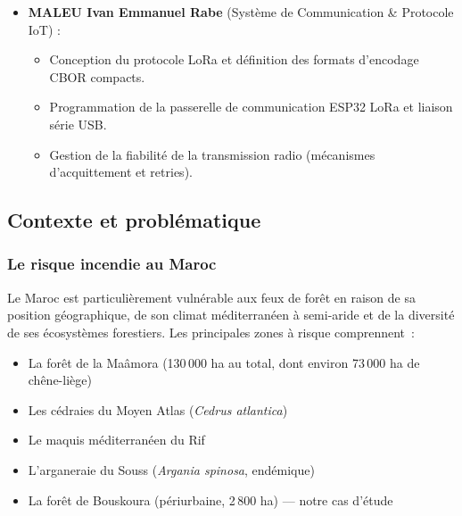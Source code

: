 \documentclass[a4paper,12pt,openany,titlepage]{scrartcl}
\begin{document}
\begin{itemize}
\begin{itemize}[nosep]
            \item Export et intégration du pipeline de vision sous format ONNX Runtime pour exécution sur le RPi4.
            \item Collecte des données de télédétection et liaison avec les modèles de combustible.
        \end{itemize}
    \item \textbf{MALEU Ivan Emmanuel Rabe} (Système de Communication \& Protocole IoT) :
        \begin{itemize}[nosep]
            \item Conception du protocole LoRa et définition des formats d'encodage CBOR compacts.
            \item Programmation de la passerelle de communication ESP32 LoRa et liaison série USB.
            \item Gestion de la fiabilité de la transmission radio (mécanismes d'acquittement et retries).
        \end{itemize}
\end{itemize}

\subsection{Contexte et problématique}

\subsubsection{Le risque incendie au Maroc}

Le Maroc est particulièrement vulnérable aux feux de forêt en raison de sa position géographique, de son climat méditerranéen à semi-aride et de la diversité de ses écosystèmes forestiers. Les principales zones à risque comprennent~:

\begin{itemize}[nosep]
    \item La forêt de la Maâmora (130\,000 ha au total, dont environ 73\,000 ha de chêne-liège)
    \item Les cédraies du Moyen Atlas (\textit{Cedrus atlantica})
    \item Le maquis méditerranéen du Rif
    \item L'arganeraie du Souss (\textit{Argania spinosa}, endémique)
    \item La forêt de Bouskoura (périurbaine, 2\,800 ha) --- notre cas d'étude
\end{itemize}
\end{document}
